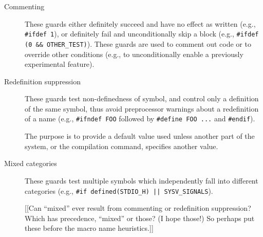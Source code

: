 \begin{description}
\item[Commenting] These guards either definitely succeed and
  have no effect as written (e.g., \texttt{\#ifdef 1}), or definitely fail
  and unconditionally skip a block (e.g., {\tt \#ifdef (0 \&\&
    \verb|OTHER_TEST|)}).  These guards are used to comment out code or to
  override other conditions (e.g., to unconditionally enable a previously
  experimental feature).
      
\item[Redefinition suppression] These guards test non-definedness of
  symbol, and control only  a definition of the same symbol, thus avoid preprocessor
      warnings about a redefinition of a name (e.g., \texttt{\#ifndef
      FOO} followed by \texttt{\#define FOO ...} and \texttt{\#endif}).
    
    The purpose is to provide a default value used unless another part of
    the system, or the compilation command, specifies another value.

\item[Mixed categories] These guards test multiple symbols
      which independently fall into different categories (e.g.,
      {\tt \#if defined(\verb|STDIO_H|) || \verb|SYSV_SIGNALS|}).

      [[Can ``mixed'' ever result from commenting or redefinition
      suppression?  Which has precedence, ``mixed'' or those?  (I hope
      those!)  So perhaps put these before the macro name heuristics.]]

\end{description}

